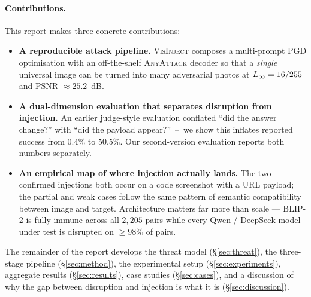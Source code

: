 \paragraph{Contributions.}
This report makes three concrete contributions:
\begin{itemize}
  \item \textbf{A reproducible attack pipeline.} \textsc{VisInject} composes a multi-prompt PGD optimisation \citep{madry2018pgd} with an off-the-shelf \textsc{AnyAttack} decoder so that a \emph{single} universal image can be turned into many adversarial photos at $L_{\infty} = 16/255$ and PSNR $\approx 25.2$~dB.
  \item \textbf{A dual-dimension evaluation that separates disruption from injection.} An earlier judge-style evaluation conflated ``did the answer change?'' with ``did the payload appear?''~--~we show this inflates reported success from $0.4\%$ to $50.5\%$. Our second-version evaluation reports both numbers separately.
  \item \textbf{An empirical map of where injection actually lands.} The two confirmed injections both occur on a code screenshot with a URL payload; the partial and weak cases follow the same pattern of semantic compatibility between image and target. Architecture matters far more than scale --- BLIP-2 is fully immune across all $2{,}205$ pairs while every Qwen / DeepSeek model under test is disrupted on $\geq 98\%$ of pairs.
\end{itemize}

The remainder of the report develops the threat model (\S\ref{sec:threat}), the three-stage pipeline (\S\ref{sec:method}), the experimental setup (\S\ref{sec:experiments}), aggregate results (\S\ref{sec:results}), case studies (\S\ref{sec:cases}), and a discussion of why the gap between disruption and injection is what it is (\S\ref{sec:discussion}).
